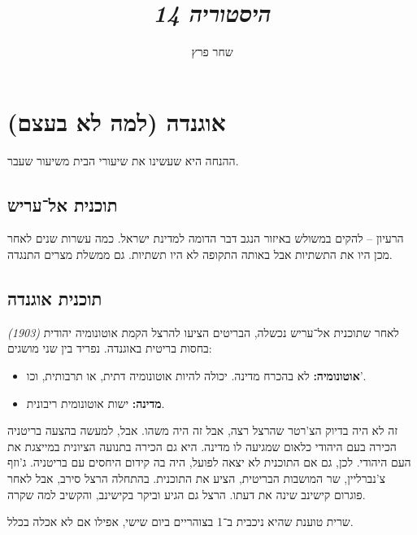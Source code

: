 \documentclass[]{article}
\author{שחר פרץ}
\title{\textit{היסטוריה 14}}
\begin{document}
	\maketitle
	\section{אוגנדה (למה לא בעצם)}
	ההנחה היא שעשינו את שיעורי הבית משיעור שעבר. 
	\subsection{תוכנית אל־עריש}
	הרעיון – להקים במשולש באיזור הנגב דבר הדומה למדינת ישראל. כמה עשרות שנים לאחר מכן היו את התשתיות אבל באותה התקופה לא היו תשתיות. גם ממשלת מצרים התנגדה. 
	\subsection{תוכנית אוגנדה}
	\textit{(1903)}	לאחר שתוכנית אל־עריש נכשלה, הבריטים הציעו להרצל הקמת אוטונומיה יהודית בחסות בריטית באוגנדה. נפריד בין שני מושגים: 
	\begin{itemize}
		\item \textbf{אוטונומיה: }לא בהכרח מדינה. יכולה להיות אוטונומיה דתית, או תרבותית, וכו'. 
		\item \textbf{מדינה: }ישות אוטונומית ריבונית. 
	\end{itemize}
	זה לא היה בדיוק הצ'רטר שהרצל רצה, אבל זה היה משהו. אבל, למעשה בהצעה בריטניה הכירה בעם היהודי כלאום שמגיעה לו מדינה. היא גם הכירה בתנועה הציונית במייצגת את העם היהודי. לכן, גם אם התוכנית לא יצאה לפועל, היה בה קידום היחסים עם בריטניה. ג'וזף צ'נברליין, שר המושבות הבריטית, הציע את התוכנית. בהתחלה הרצל סירב, אבל לאחר פוגרום קישינב שינה את דעתו. הרצל גם הגיע וביקר בקישינב, והקשיב למה שקרה. 
	
	שרית טוענת שהיא ניכבית ב־1 בצוהריים ביום שישי, אפילו אם לא אכלה בכלל. 
	
\end{document}
